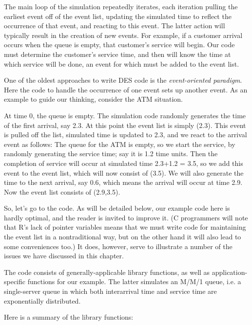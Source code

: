 The main loop of the simulation repeatedly iterates, each iteration
pulling the earliest event off of the event list, updating the simulated
time to reflect the occurrence of that event, and reacting to this
event.  The latter action will typically result in the creation of new
events.  For example, if a customer arrival occurs when the queue is
empty, that customer's service will begin.  Our code must determine the
customer's service time, and then will know the time at which service
will be done, an event for which must be added to the event list.

One of the oldest approaches to write DES code is the {\it
event-oriented paradigm}.  Here the code to handle the occurrence of one
event sets up another event.  As an example to guide our thinking,
consider the ATM situation.

At time 0, the queue is empty.  The simulation code randomly generates
the time of the first arrival, say 2.3.  At this point the event list is
simply (2.3).  This event is pulled off the list, simulated time is
updated to 2.3, and we react to the arrival event as follows:  The queue
for the ATM is empty, so we start the service, by randomly generating
the service time; say it is  1.2 time units.  Then the completion of
service will occur at simulated time 2.3+1.2 = 3.5, so we add this event
to the event list, which will now consist of (3.5).  We will also
generate the time to the next arrival, say 0.6, which means the arrival
will occur at time 2.9.  Now the event list consists of (2.9,3.5).

So, let's go to the code.  As will be detailed below, our example code
here is hardly optimal, and the reader is invited to improve it.  (C
programmers will note that R's lack of pointer variables means that we
must write code for maintaining the event list in a nontraditional way,
but on the other hand it will also lead to some conveniences too.) It
does, however, serve to illustrate a number of the issues we have
discussed in this chapter.

The code consists of generally-applicable library functions, as well as
application-specific functions for our example.  The latter simulates an
M/M/1 queue, i.e. a single-server queue in which both interarrival time
and service time are exponentially distributed.  

Here is a summary of the library functions:

